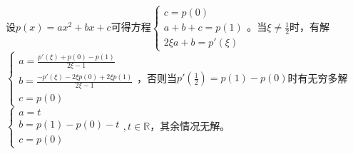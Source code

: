 \documentclass[a4paper,UTF8,fontset=windows]{ctexart}
\begin{document}
\begin{enumerate}
    设$p(x)=ax^2+bx+c$可得方程$\begin{cases}c=p(0)\\a+b+c=p(1)\\2\xi a+ b=p'(\xi)\end{cases}$。当$\xi\ne\frac{1}{2}$时，有解$\begin{cases}a=\frac{p'(\xi)+p(0)-p(1)}{2\xi-1}\\b=\frac{-p'(\xi)-2\xi p(0)+2\xi p(1)}{2\xi-1}\\c=p(0)\end{cases}$，否则当$p'(\frac{1}{2})=p(1)-p(0)$时有无穷多解$\begin{cases}a=t\\b=p(1)-p(0)-t\\c=p(0)\end{cases},t\in\mathbb{R}$，其余情况无解。
\end{enumerate}
\end{document}
